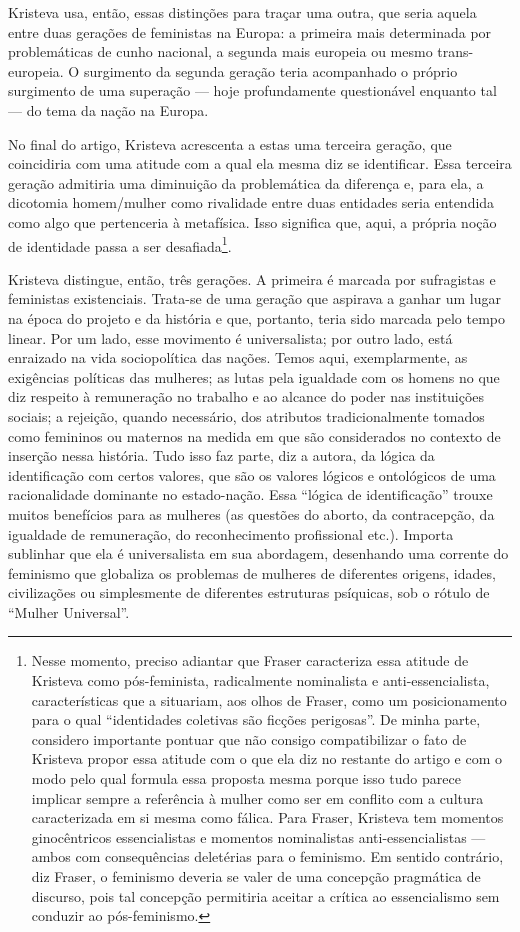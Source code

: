 Kristeva usa, então, essas distinções para traçar uma outra, que seria
aquela entre duas gerações de feministas na Europa: a primeira mais
determinada por problemáticas de cunho nacional, a segunda mais europeia
ou mesmo trans-europeia. O surgimento da segunda geração teria
acompanhado o próprio surgimento de uma superação --- hoje profundamente
questionável enquanto tal --- do tema da nação na Europa.

No final do artigo, Kristeva acrescenta a estas uma terceira geração,
que coincidiria com uma atitude com a qual ela mesma diz se identificar.
Essa terceira geração admitiria uma diminuição da problemática da
diferença e, para ela, a dicotomia homem/mulher como rivalidade entre
duas entidades seria entendida como algo que pertenceria à metafísica.
Isso significa que, aqui, a própria noção de identidade passa a ser
desafiada\footnote{Nesse momento, preciso adiantar que Fraser
  caracteriza essa atitude de Kristeva como pós-feminista, radicalmente
  nominalista e anti-essencialista, características que a situariam, aos
  olhos de Fraser, como um posicionamento para o qual ``identidades
  coletivas são ficções perigosas''. De minha parte, considero
  importante pontuar que não consigo compatibilizar o fato de Kristeva
  propor essa atitude com o que ela diz no restante do artigo e com o
  modo pelo qual formula essa proposta mesma porque isso tudo parece
  implicar sempre a referência à mulher como ser em conflito com a
  cultura caracterizada em si mesma como fálica. Para Fraser, Kristeva
  tem momentos ginocêntricos essencialistas e momentos nominalistas
  anti-essencialistas --- ambos com consequências deletérias para o
  feminismo. Em sentido contrário, diz Fraser, o feminismo deveria se
  valer de uma concepção pragmática de discurso, pois tal concepção
  permitiria aceitar a crítica ao essencialismo sem conduzir ao
  pós-feminismo.}.

Kristeva distingue, então, três gerações. A primeira é marcada por
sufragistas e feministas existenciais. Trata-se de uma geração que
aspirava a ganhar um lugar na época do projeto e da história e que,
portanto, teria sido marcada pelo tempo linear. Por um lado, esse
movimento é universalista; por outro lado, está enraizado na vida
sociopolítica das nações. Temos aqui, exemplarmente, as exigências
políticas das mulheres; as lutas pela igualdade com os homens no que diz
respeito à remuneração no trabalho e ao alcance do poder nas
instituições sociais; a rejeição, quando necessário, dos atributos
tradicionalmente tomados como femininos ou maternos na medida em que são
considerados no contexto de inserção nessa história. Tudo isso faz
parte, diz a autora, da lógica da identificação com certos valores, que
são os valores lógicos e ontológicos de uma racionalidade dominante no
estado-nação. Essa ``lógica de identificação'' trouxe muitos benefícios
para as mulheres (as questões do aborto, da contracepção, da igualdade
de remuneração, do reconhecimento profissional etc.). Importa sublinhar
que ela é universalista em sua abordagem, desenhando uma corrente do
feminismo que globaliza os problemas de mulheres de diferentes origens,
idades, civilizações ou simplesmente de diferentes estruturas psíquicas,
sob o rótulo de ``Mulher Universal''.

